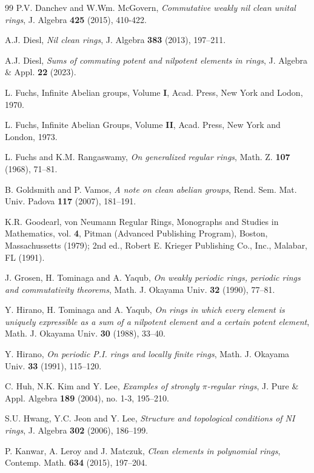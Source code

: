 \documentclass[12pt]{amsart}
\theoremstyle{definition}
\theoremstyle{remark}
\numberwithin{equation}{section}
\begin{document}
\begin{thebibliography}{99}
P.V. Danchev and W.Wm. McGovern, {\it Commutative weakly nil clean unital rings}, J. Algebra {\bf 425} (2015), 410-422.

A.J. Diesl, {\it Nil clean rings}, J. Algebra \textbf{383} (2013), 197--211.

A.J. Diesl, {\it Sums of commuting potent and nilpotent elements in rings}, J. Algebra \& Appl. \textbf{22} (2023).

L. Fuchs, Infinite Abelian groups, Volume {\bf I}, Acad. Press, New York and Lodon, 1970.

L. Fuchs, Infinite Abelian Groups, Volume {\bf II}, Acad. Press, New York and London, 1973.

L. Fuchs and K.M. Rangaswamy, {\it On generalized regular rings}, Math. Z. \textbf{107} (1968), 71--81.

B. Goldsmith and P. Vamos, {\it A note on clean abelian groups}, Rend. Sem. Mat. Univ. Padova \textbf{117} (2007), 181--191.

K.R. Goodearl, von Neumann Regular Rings, Monographs and Studies in Mathematics, vol. {\bf 4}, Pitman (Advanced Publishing Program), Boston, Massachussetts (1979); 2nd ed., Robert E. Krieger Publishing Co., Inc., Malabar, FL (1991).

J. Grosen, H. Tominaga and A. Yaqub, {\it On weakly periodic rings, periodic rings and commutativity theorems}, Math. J. Okayama Univ. \textbf{32} (1990), 77--81.

Y. Hirano, H. Tominaga and A. Yaqub, {\it On rings in which every element is uniquely expressible as a sum of a nilpotent element and a certain potent element}, Math. J. Okayama Univ. \textbf{30} (1988), 33--40.

Y. Hirano, {\it On periodic P.I. rings and locally finite rings}, Math. J. Okayama Univ. \textbf{33} (1991), 115--120.

C. Huh, N.K. Kim and Y. Lee, {\it Examples of strongly $\pi$-regular rings}, J. Pure \& Appl. Algebra \textbf{189} (2004), no. 1-3, 195--210.

S.U. Hwang, Y.C. Jeon and Y. Lee, {\it Structure and topological conditions of NI rings}, J. Algebra \textbf{302} (2006), 186--199.

P. Kanwar, A. Leroy and J. Matczuk, {\it Clean elements in polynomial rings}, Contemp. Math. \textbf{634} (2015), 197--204.


\end{thebibliography}
\end{document}
